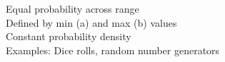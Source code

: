 \documentclass[preview]{standalone}
\begin{document}
Equal probability across range\\Defined by min (a) and max (b) values\\Constant probability density\\Examples: Dice rolls, random number generators\\
\end{document}
